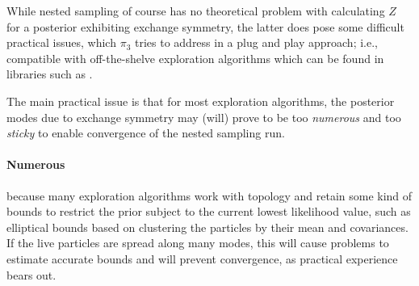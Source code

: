 \begin{chapterappendices}{6}

While nested sampling of course has no theoretical problem with calculating $Z$ for a posterior exhibiting exchange symmetry, the latter does pose some difficult practical issues, which $\pi_3$ tries to address in a plug and play approach; i.e., compatible with off-the-shelve exploration algorithms which can be found in libraries such as \dynesty.

The main practical issue is that for most exploration algorithms, the posterior modes due to exchange symmetry may (will) prove to be too \emph{numerous} and too \emph{sticky} to enable convergence of the nested sampling run.

\paragraph{Numerous} because many exploration algorithms work with topology and retain some kind of bounds to restrict the prior subject to the current lowest likelihood value, such as elliptical bounds based on clustering the particles by their mean and covariances. If the live particles are spread along many modes, this will cause problems to estimate accurate bounds and will prevent convergence, as practical experience bears out.


\end{chapterappendices}

